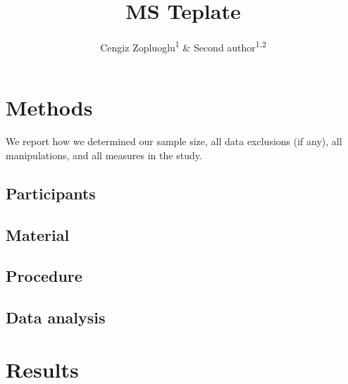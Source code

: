 \documentclass[
  english,
  man]{apa6}
\title{MS Teplate}
\author{Cengiz Zopluoglu\textsuperscript{1} \& Second author\textsuperscript{1,2}}
\date{}
\affiliation{\vspace{0.5cm}\textsuperscript{1} University of Oregon\\\textsuperscript{2} Institution XYZ}
\begin{document}
\maketitle

\hypertarget{methods}{%
\section{Methods}\label{methods}}

We report how we determined our sample size, all data exclusions (if any), all manipulations, and all measures in the study.

\hypertarget{participants}{%
\subsection{Participants}\label{participants}}

\hypertarget{material}{%
\subsection{Material}\label{material}}

\hypertarget{procedure}{%
\subsection{Procedure}\label{procedure}}

\hypertarget{data-analysis}{%
\subsection{Data analysis}\label{data-analysis}}

\hypertarget{results}{%
\section{Results}\label{results}}
\end{document}
